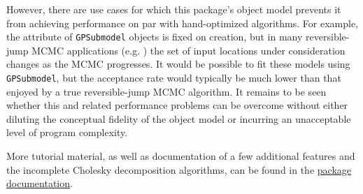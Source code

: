 \documentclass[article]{jss}
\begin{document}
However, there are use cases for which this package's object model prevents it from achieving performance on par with hand-optimized algorithms. For example, the  attribute of \texttt{GPSubmodel} objects is fixed on creation, but in many reversible-jump MCMC applications (e.g. \cite{gramacy}) the set of input locations under consideration changes as the MCMC progresses. It would be possible to fit these models using \texttt{GPSubmodel}, but the acceptance rate would typically be much lower than that enjoyed by a true reversible-jump MCMC algorithm. It remains to be seen whether this and related performance problems can be overcome without either diluting the conceptual fidelity of the object model or incurring an unacceptable level of program complexity.

More tutorial material, as well as documentation of a few additional features and the incomplete Cholesky decomposition algorithms, can be found in the \href{http://pymc.googlecode.com/files/GPUserGuide.pdf}{package documentation}.


\end{document}
